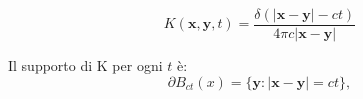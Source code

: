 \documentclass[10pt,a4paper,twoside,openright]{book}
\newcommand{\x}{\mathbf{x}}
\newcommand{\y}{\mathbf{y}}
\begin{document}
\begin{equation}
	\boxed{K(\x ,\y ,t) =\frac{\delta (| \x -\y| -ct)}{4\pi c| \x -\y| }}
\end{equation}
\begin{oss}
	Il supporto di K per ogni $\displaystyle t$ è:
	\begin{equation}
		\partial B_{ct}( x) =\{\y :| \x -\y| =ct\} ,
	\end{equation}


	\begin{figure}[H]
		\centering

	\begin{tikzpicture}[x=0.75pt,y=0.75pt,yscale=-1,xscale=1]


\end{tikzpicture}
\end{figure}
\end{oss}
\end{document}
